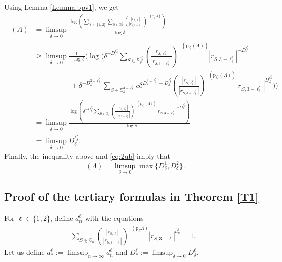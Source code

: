 \documentclass[a4paper, 11pt]{article}
\DeclareMathOperator{\dB}{\dim_{\mathrm{B}}}
\numberwithin{equation}{section}
\theoremstyle{plain}
\theoremstyle{remark}
\theoremstyle{definition}
\begin{document}
\noindent Using Lemma \ref{Lemma:bpv1}, we get
\begin{align*}
\dB(\Lambda) &= \limsup_{\delta \to 0} \frac{\log \left(\sum_{\ell \in \{1,2\}} \sum_{S \in \mathbb{S}_\delta^\ell} \left(\frac{|r_{S,\ell}|}{|r_{S,3-\ell}|}\right)^{\dB(\mathrm{p}_\ell\Lambda)}\right)}{-\log\delta} \\
&\geq \limsup_{\delta \to 0} \frac{1}{-\log\delta} \Bigg(\log \Bigg(\delta^{-D_\delta^{\ell_\delta^*}}\sum_{S \in \mathbb{S}_\delta^{\ell_\delta^*}} \left(\frac{|r_{S,\ell_\delta^*}|}{|r_{S,3-\ell_\delta^*}|}\right)^{\dB(\mathrm{p}_{\ell_\delta^*}(\Lambda))}|r_{S,3-\ell_\delta^*}|^{-D_\delta^{\ell_\delta^*}} \\
& \quad \quad \quad \quad \quad  + \delta^{-D_\delta^{3-\ell_\delta^*}}\sum_{S \in \mathbb{S}_\delta^{3-\ell_\delta^*}} c \delta^{D_\delta^{3-\ell_\delta^*}-D_\delta^{\ell_\delta^*}} \left(\frac{|r_{S,\ell_\delta^*}|}{|r_{S,3-\ell_\delta^*}|}\right)^{\dB(\mathrm{p}_{\ell_\delta^*}(\Lambda))}|r_{S,3-\ell_\delta^*}|^{D_\delta^{\ell_\delta^*}} \Bigg) \Bigg) \\
&=\limsup_{\delta \to 0} \frac{\log \left(\delta^{-D_\delta^{\ell_\delta^*}}\sum_{S \in \mathbb{S}_\delta} \left(\frac{|r_{S,\ell_\delta^*}|}{|r_{S,3-\ell_\delta^*}|}\right)^{\dB(\mathrm{p}_{\ell_\delta^*}(\Lambda))}|r_{S,3-\ell_\delta^*}|^{-D_\delta^{\ell_\delta^*}} \right)}{-\log\delta} \\
&= \limsup_{\delta \to 0} D_\delta^{\ell_\delta^*}.
\end{align*}
Finally, the inequality above and \eqref{eq:2ub} imply that
\begin{equation}\label{eq:step2b}
	\dB(\Lambda)=\limsup_{\delta\to0}\max\{D_\delta^1,D_\delta^2\}.
\end{equation}

\subsection{Proof of the tertiary formulas in Theorem \ref{T1}} \label{subsec:tertform}
For $\ell \in \{1,2\}$, define $d_n^\ell$ with the equations
\begin{equation*}\begin{aligned}
\sum_{S \in \mathbb{G}_n} \left( \frac{|r_{S,\ell}|}{|r_{S,3-\ell}|} \right)^{\dB(\mathrm{p}_\ell\Lambda)} |r_{S,3-\ell}|^{d_n^\ell} = 1.
\end{aligned}\end{equation*}
Let us define $d_*^\ell := \limsup_{n \to \infty} d_n^\ell$ and $D_*^\ell:=\limsup_{\delta\to0}D_\delta^\ell$.
\end{document}
